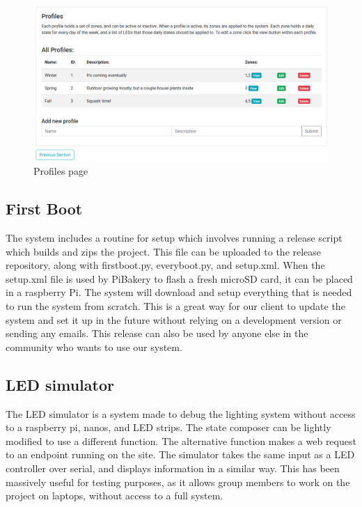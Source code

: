 \documentclass[onecolumn, draftclsnofoot,10pt, compsoc]{IEEEtran}
\begin{document}
		\begin{center}
			\begin{figure}[H]
				\includegraphics[width=\linewidth]{site/profiles.png}
				\caption{Profiles page}
				\label{fig:siteProfiles}
			\end{figure}
		\end{center}


	\subsection{First Boot}
		\noindent The system includes a routine for setup which involves running a release script which builds and zips the project.
		This file can be uploaded to the release repository, along with firstboot.py, everyboot.py, and setup.xml.
		When the setup.xml file is used by PiBakery to flash a fresh microSD card, it can be placed in a raspberry Pi.
		The system will download and setup everything that is needed to run the system from scratch.
		This is a great way for our client to update the system and set it up in the future without relying on a development version or sending any emails.
		This release can also be used by anyone else in the community who wants to use our system.
	\subsection{LED simulator}
		\noindent The LED simulator is a system made to debug the lighting system without access to a raspberry pi, nanos, and LED strips.
		The state composer can be lightly modified to use a different function. The alternative function makes a web request to an endpoint running on the 
		site. The simulator takes the same input as a LED controller over serial, and displays information in a similar way. This has been massively useful 
		for testing purposes, as it allows group members to work on the project on laptops, without access to a full system.
\end{document}
